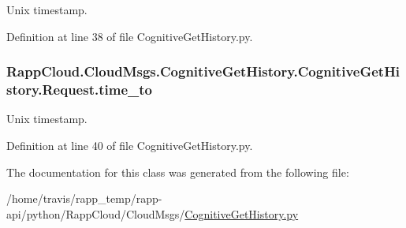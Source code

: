 Unix timestamp. 



Definition at line 38 of file Cognitive\-Get\-History.\-py.

\hypertarget{classRappCloud_1_1CloudMsgs_1_1CognitiveGetHistory_1_1CognitiveGetHistory_1_1Request_a48bfcc4c912e739f24781fa20bd0664c}{
\subsubsection[{time\-\_\-to}]{\setlength{\rightskip}{0pt plus 5cm}Rapp\-Cloud.\-Cloud\-Msgs.\-Cognitive\-Get\-History.\-Cognitive\-Get\-History.\-Request.\-time\-\_\-to}}\label{classRappCloud_1_1CloudMsgs_1_1CognitiveGetHistory_1_1CognitiveGetHistory_1_1Request_a48bfcc4c912e739f24781fa20bd0664c}


Unix timestamp. 



Definition at line 40 of file Cognitive\-Get\-History.\-py.



The documentation for this class was generated from the following file\-:\begin{DoxyCompactItemize}
\item 
/home/travis/rapp\-\_\-temp/rapp-\/api/python/\-Rapp\-Cloud/\-Cloud\-Msgs/\hyperlink{CognitiveGetHistory_8py}{Cognitive\-Get\-History.\-py}\end{DoxyCompactItemize}

